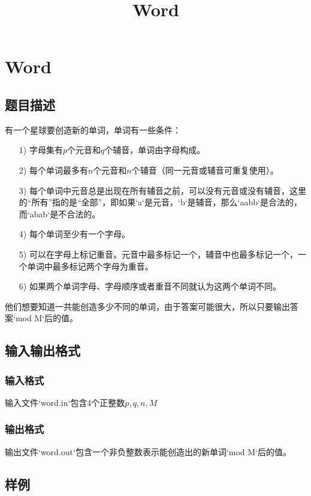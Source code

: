 \documentclass[hyperref,UTF8,12pt,a4paper]{ctexart}
\title{Word}
\author{}
\date{}
\begin{document}
\section{Word}

\subsection{题目描述}

有一个星球要创造新的单词，单词有一些条件：

\begin{itemize}
\item [1)]
字母集有$p$个元音和$q$个辅音，单词由字母构成。
\item [2)]
每个单词最多有$n$个元音和$n$个辅音（同一元音或辅音可重复使用）。
\item [3)]
每个单词中元音总是出现在所有辅音之前，可以没有元音或没有辅音，这里的“所有”指的是“全部”，即如果`a`是元音，`b`是辅音，那么`aabb`是合法的，而`abab`是不合法的。
\item [4)]
每个单词至少有一个字母。
\item [5)]
可以在字母上标记重音。元音中最多标记一个，辅音中也最多标记一个，一个单词中最多标记两个字母为重音。
\item [6)]
如果两个单词字母、字母顺序或者重音不同就认为这两个单词不同。
\end{itemize}

他们想要知道一共能创造多少不同的单词，由于答案可能很大，所以只要输出答案`mod M`后的值。

\subsection{输入输出格式}

\subsubsection{输入格式}

输入文件`word.in`包含4个正整数$p,q,n,M$

\subsubsection{输出格式}

输出文件`word.out`包含一个非负整数表示能创造出的新单词`mod M`后的值。

\subsection{样例}
\end{document}
